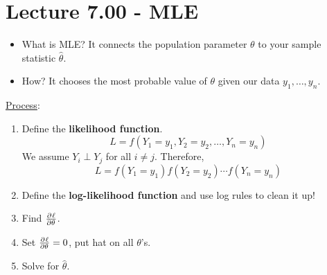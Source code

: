 \section{Lecture 7.00 - MLE}
\begin{itemize}
    \item What is MLE\@? It connects the population parameter $ \theta $
          to your sample statistic $ \hat{\theta} $.
    \item How? It chooses the most probable value of $ \theta $
          given our data $ y_1,\ldots,y_n $.
\end{itemize}
\underline{Process}:
\begin{enumerate}[(1)]
    \item Define the \textbf{likelihood function}.
          \[ L=f(Y_1=y_1,Y_2=y_2,\ldots,Y_n=y_n) \]
          We assume $ Y_i\perp Y_j $ for all $ i\ne j $. Therefore,
          \[ L=f(Y_1=y_1)f(Y_2=y_2)\cdots f(Y_n=y_n) \]
    \item Define the \textbf{log-likelihood function} and use log rules to
          clean it up!
    \item Find $ \pd{\ell}{\theta} $.
    \item Set $ \pd{\ell}{\theta}=0 $, put hat on all $ \theta $'s.
    \item Solve for $ \hat{\theta} $.
\end{enumerate}
